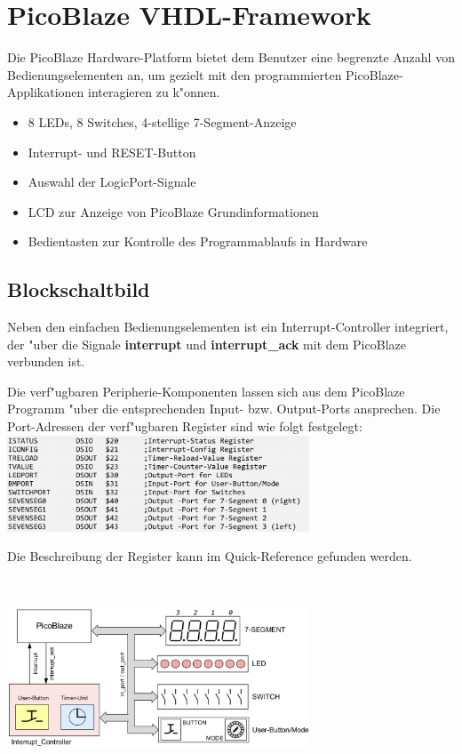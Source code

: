 \section{PicoBlaze VHDL-Framework}
Die PicoBlaze Hardware-Platform bietet dem Benutzer eine begrenzte Anzahl von Bedienungselementen an, um gezielt mit den programmierten PicoBlaze-Applikationen interagieren zu k"onnen.
\begin{itemize}
	\item 8 LEDs, 8 Switches, 4-stellige 7-Segment-Anzeige
	\item Interrupt- und RESET-Button
	\item Auswahl der LogicPort-Signale
	\item LCD zur Anzeige von PicoBlaze Grundinformationen
	\item Bedientasten zur Kontrolle des Programmablaufs in Hardware
\end{itemize}

\subsection{Blockschaltbild}
\begin{minipage}{9cm}
	Neben den einfachen Bedienungselementen ist ein Interrupt-Controller integriert, der "uber die Signale \textbf{interrupt} und \textbf{interrupt\_ack} mit dem PicoBlaze verbunden ist.

	Die verf"ugbaren Peripherie-Komponenten lassen sich aus dem PicoBlaze Programm "uber die entsprechenden Input- bzw. Output-Ports ansprechen. Die Port-Adressen der verf"ugbaren Register sind wie folgt festgelegt:\\
	
		\includegraphics[width=9cm]{pics/8-Registeradressen}
		
	Die Beschreibung der Register kann im Quick-Reference gefunden werden.

\end{minipage}
%
\begin{minipage}{0.5cm}
	\ \
\end{minipage}
%
\begin{minipage}{9cm}
	\includegraphics[width=9cm]{pics/8-Blockschaltbild}
\end{minipage}



